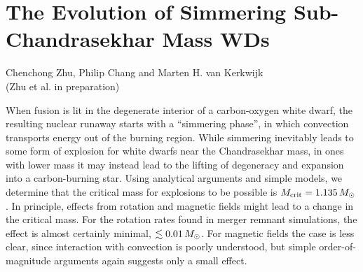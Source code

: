 \chapter{The Evolution of Simmering Sub-Chandrasekhar Mass WDs}
\label{ch:ch5}

\begin{center}
\begin{minipage}[c]{4.75in}
Chenchong Zhu, Philip Chang and Marten H. van Kerkwijk\\
(Zhu et al. in preparation)
\vspace{2em}
\end{minipage}
\end{center}

When fusion is lit in the degenerate interior of a carbon-oxygen white dwarf, the resulting nuclear runaway starts with a ``simmering phase'', in which convection transports energy out of the burning region.  While simmering inevitably leads to some form of explosion for white dwarfs near the Chandrasekhar mass, in ones with lower mass it may instead lead to the lifting of degeneracy and expansion into a carbon-burning star.  Using analytical arguments and simple models, we determine that the critical mass for explosions to be possible is $\Mcrit = 1.135\,\Msun$.  In principle, effects from rotation and magnetic fields might lead to a change in the critical mass.  For the rotation rates found in merger remnant simulations, the effect is almost certainly minimal, $\lesssim0.01\,\Msun$.  For magnetic fields the case is less clear, since interaction with convection is poorly understood, but simple order-of-magnitude arguments again suggests only a small effect.
